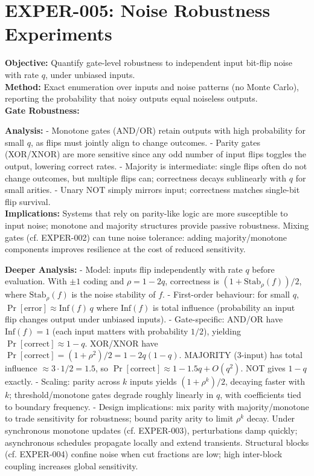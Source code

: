 \documentclass[11pt]{article}
\begin{document}
\section{EXPER-005: Noise Robustness Experiments}
\textbf{Objective:} Quantify gate-level robustness to independent input bit-flip noise with rate $q$, under unbiased inputs.\\
\textbf{Method:} Exact enumeration over inputs and noise patterns (no Monte Carlo), reporting the probability that noisy outputs equal noiseless outputs.\\
\textbf{Gate Robustness:}\\
\begin{center}
\end{center}
\textbf{Analysis:}
- Monotone gates (AND/OR) retain outputs with high probability for small $q$, as flips must jointly align to change outcomes.
- Parity gates (XOR/XNOR) are more sensitive since any odd number of input flips toggles the output, lowering correct rates.
- Majority is intermediate: single flips often do not change outcomes, but multiple flips can; correctness decays sublinearly with $q$ for small arities.
- Unary NOT simply mirrors input; correctness matches single-bit flip survival.\\
\textbf{Implications:} Systems that rely on parity-like logic are more susceptible to input noise; monotone and majority structures provide passive robustness. Mixing gates (cf. EXPER-002) can tune noise tolerance: adding majority/monotone components improves resilience at the cost of reduced sensitivity.

\textbf{Deeper Analysis:}
- Model: inputs flip independently with rate $q$ before evaluation. With $\pm 1$ coding and $\rho = 1-2q$, correctness is $(1+\mathrm{Stab}_\rho(f))/2$, where $\mathrm{Stab}_\rho(f)$ is the noise stability of $f$.
- First-order behaviour: for small $q$, $\Pr[\text{error}] \approx \mathrm{Inf}(f)\,q$ where $\mathrm{Inf}(f)$ is total influence (probability an input flip changes output under unbiased inputs).
- Gate-specific: AND/OR have $\mathrm{Inf}(f)=1$ (each input matters with probability $1/2$), yielding $\Pr[\text{correct}]\approx 1-q$. XOR/XNOR have $\Pr[\text{correct}] = (1+\rho^2)/2 = 1-2q(1-q)$. MAJORITY (3-input) has total influence $\approx 3\cdot 1/2 = 1.5$, so $\Pr[\text{correct}]\approx 1-1.5q + O(q^2)$. NOT gives $1-q$ exactly.
- Scaling: parity across $k$ inputs yields $(1+\rho^k)/2$, decaying faster with $k$; threshold/monotone gates degrade roughly linearly in $q$, with coefficients tied to boundary frequency.
- Design implications: mix parity with majority/monotone to trade sensitivity for robustness; bound parity arity to limit $\rho^k$ decay. Under synchronous monotone updates (cf. EXPER-003), perturbations damp quickly; asynchronous schedules propagate locally and extend transients. Structural blocks (cf. EXPER-004) confine noise when cut fractions are low; high inter-block coupling increases global sensitivity.
\end{document}
